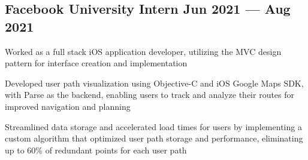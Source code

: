 % 
\subsection{{Facebook University Intern \hfill Jun 2021 --- Aug 2021}}
\begin{zitemize}
\item Worked as a full stack iOS application developer, utilizing the MVC design pattern for interface creation and implementation
\item Developed user path visualization using Objective-C and iOS Google Maps SDK, with Parse as the backend, enabling users to track and analyze their routes for improved navigation and planning
\item Streamlined data storage and accelerated load times for users by implementing a custom algorithm that optimized user path storage and performance, eliminating up to 60\% of redundant points for each user path
\end{zitemize}

